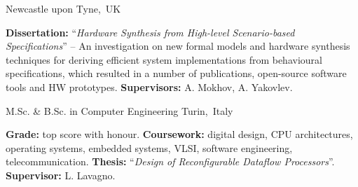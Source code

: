 
\begin{cventries}
\vspace{-5mm}

\cventry
{} %
{} %
{\vspace{-9mm}Newcastle upon Tyne,~UK} %
{} %
{ %
\begin{cvitems}
\textbf{Dissertation:} ``\textit{Hardware Synthesis from High-level 
Scenario-based 
Specifications}'' -- An investigation on new formal models and 
hardware synthesis techniques for deriving efficient system implementations 
from behavioural specifications, which resulted in a number of publications,
open-source software tools and HW prototypes.
\textbf{Supervisors:} A. Mokhov, A. Yakovlev.
\end{cvitems}
}
\vspace{-4mm}

\cventry
{}
{\vspace{-9mm}M.Sc. \& B.Sc. in Computer Engineering }
{\vspace{-9mm}Turin,~Italy}
{}
{
\begin{cvitems}
\textbf{Grade:} top score with honour. \textbf{Coursework:} 
digital design, CPU architectures, operating systems, embedded systems, VLSI,
software engineering, telecommunication. \textbf{Thesis:} 
``\emph{Design of Reconfigurable Dataflow Processors}''. \textbf{Supervisor:} 
L. Lavagno.
\end{cvitems}
}


\end{cventries}
\vspace{-3mm}
